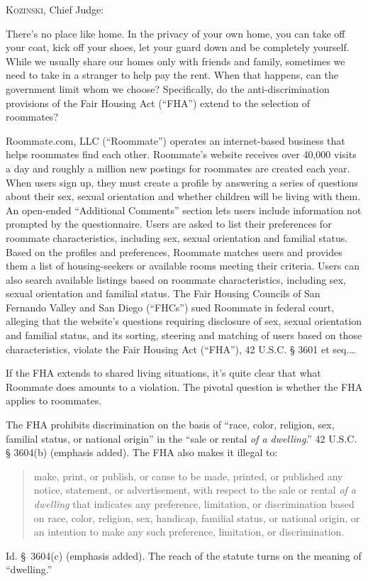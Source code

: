 

\textsc{Kozinski}, Chief Judge:

There's no place like home. In the privacy of your own home, you can take off
your coat, kick off your shoes, let your guard down and be completely yourself.
While we usually share our homes only with friends and family, sometimes we
need to take in a stranger to help pay the rent. When that happens, can the
government limit whom we choose? Specifically, do the anti-discrimination
provisions of the Fair Housing Act (``FHA'') extend to the selection of
roommates?

Roommate.com, LLC (``Roommate'') operates an internet-based business that helps
roommates find each other. Roommate's website receives over 40,000 visits a day
and roughly a million new postings for roommates are created each year. When
users sign up, they must create a profile by answering a series of questions
about their sex, sexual orientation and whether children will be living with
them. An open-ended ``Additional Comments'' section lets users include
information not prompted by the questionnaire. Users are asked to list their
preferences for roommate characteristics, including sex, sexual orientation and
familial status. Based on the profiles and preferences, Roommate matches users
and provides them a list of housing-seekers or available rooms meeting their
criteria. Users can also search available listings based on roommate
characteristics, including sex, sexual orientation and familial status.  The
Fair Housing Councils of San Fernando Valley and San Diego (``FHCs'') sued
Roommate in federal court, alleging that the website's questions requiring
disclosure of sex, sexual orientation and familial status, and its sorting,
steering and matching of users based on those characteristics, violate the Fair
Housing Act (``FHA''), 42 U.S.C. {\S} 3601 et seq.\ldots


If the FHA extends to shared living situations, it's quite clear that what
Roommate does amounts to a violation. The pivotal question is whether the FHA
applies to roommates. 


The FHA prohibits discrimination on the basis of ``race, color, religion, sex,
familial status, or national origin'' in the ``sale or rental \textit{of a
dwelling}.'' 42 U.S.C. {\S} 3604(b) (emphasis added). The FHA also makes it
illegal to: 
\begin{quote}
make, print, or publish, or cause to be made, printed, or published any notice,
statement, or advertisement, with respect to the sale or rental \textit{of a
dwelling} that indicates any preference, limitation, or discrimination based on
race, color, religion, sex, handicap, familial status, or national origin, or
an intention to make any such preference, limitation, or discrimination.  
\end{quote}
Id. \S~3604(c) (emphasis added). The reach of the statute turns on the meaning
of ``dwelling.''

